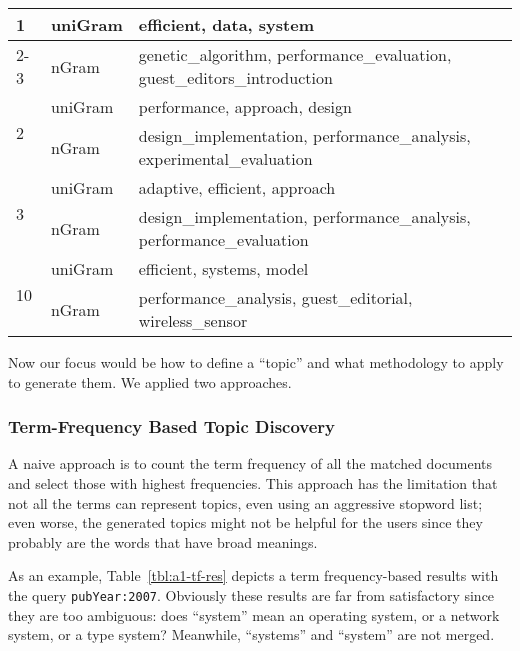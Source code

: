 \begin{table*}[!ht]
\caption{TNG Based Top-10 Topics in 2007 (partly listed 1,2,3,$\ldots$10)}\label{tbl:a1-tng-res}
\centering
\label{my-label}
\begin{tabular}{|l|l|l|}
\hline
\multirow{2}{*}{1} & uniGram & efficient, data, system                                                   \\ \cline{2-3}
                   & nGram   & genetic\_algorithm, performance\_evaluation, guest\_editors\_introduction \\ \hline
\multirow{2}{*}{2} & uniGram & performance, approach, design                                             \\ \cline{2-3}
                   & nGram   & design\_implementation, performance\_analysis, experimental\_evaluation   \\ \hline
\multirow{2}{*}{3} & uniGram & adaptive, efficient, approach                                             \\ \cline{2-3}
                   & nGram   & design\_implementation, performance\_analysis, performance\_evaluation    \\ \hline
\multirow{2}{*}{10} & uniGram & efficient, systems, model                                                 \\ \cline{2-3}
                   & nGram   & performance\_analysis, guest\_editorial, wireless\_sensor                 \\ \hline
\end{tabular}
\end{table*}

Now our focus would be how to define a ``topic'' and what methodology to apply to generate them. We applied two approaches.




\subsubsection{Term-Frequency Based Topic Discovery}\label{sec:a1-tf}
A naive approach is to count the term frequency of all the matched documents and select those with highest frequencies. This approach has the limitation that not all the terms can represent topics, even using an aggressive stopword list; even worse, the generated topics might  not be helpful for the users since they probably are the words that have broad meanings.


As an example, Table~\ref{tbl:a1-tf-res} depicts a term frequency-based results with the query \verb|pubYear:2007|. Obviously these results are far from satisfactory since they are too ambiguous: does ``system'' mean an operating system, or a network system, or a type system? Meanwhile, ``systems'' and ``system'' are not merged.


